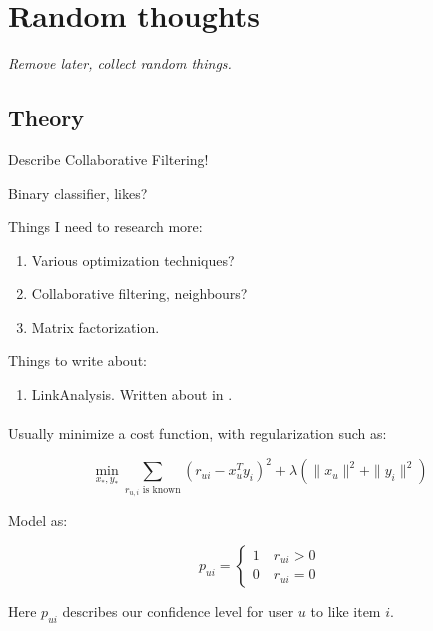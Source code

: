 \chapter{Random thoughts}

\textit{Remove later, collect random things.}

\section{Theory}

Describe Collaborative Filtering!

Binary classifier, likes?

Things I need to research more:

\begin{enumerate}
    \item Various optimization techniques?
    \item Collaborative filtering, neighbours? \cite{hu2008collaborative}
    \item Matrix factorization.
\end{enumerate}

Things to write about:

\begin{enumerate}
    \item LinkAnalysis. Written about in \cite{huang2007comparison}.
\end{enumerate}


\subsubsection{\cite{hu2008collaborative}}

Usually minimize a cost function, with regularization such as:

\begin{equation}
    \min_{x_*, y_*} \sum_{r_{u,i} \text{ is known} } (r_{ui} - x_{u}^T y_i)^2 + \lambda(\|x_u\|^2 + \|y_i\|^2)
\end{equation}

Model as:

\begin{equation}
    p_{ui} = \begin{cases}
        1 \quad r_{ui} > 0 \\
        0 \quad r_{ui} = 0
    \end{cases}
\end{equation}

Here $p_{ui}$ describes our confidence level for user $u$ to like item $i$.

